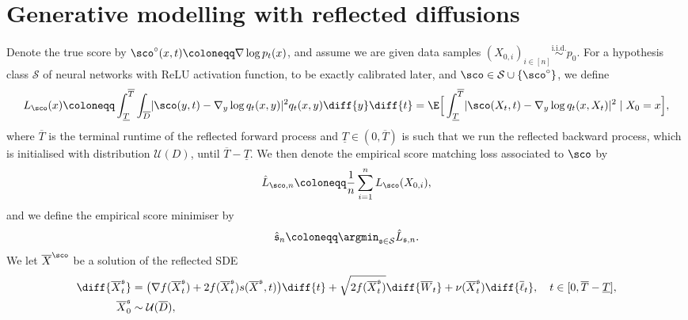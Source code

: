 \documentclass[a4paper, 11pt, headings = small, abstract]{scrartcl}
\begin{document}
\section{Generative modelling with reflected diffusions}\label{sec:main}
Denote the true score by $\sco^\circ(x,t) \coloneqq \nabla \log p_t(x)$, and assume we are given data samples $(X_{0,i})_{i \in [n]} \overset{\text{i.i.d.}}{\sim} p_0$. For a hypothesis class $\mathcal{S}$ of neural networks with ReLU activation function, to be exactly calibrated later,  and $\sco \in \mathcal{S} \cup \{\sco^\circ\}$, we define 
\begin{equation}\label{eq:lossfct}
    L_{\sco}(x) \coloneqq \int_{\underline{T}}^{\overline{T}} \int_{\overline{D}} \lvert \sco(y,t) - \nabla_y \log q_t(x,y) \rvert^2 q_t(x,y) \diff{y} \diff{t} = \E\Big[\int_{\underline{T}}^{\overline{T}} \lvert \sco(X_t,t) - \nabla_y \log q_t(x,X_t) \rvert^2 \mid X_0 = x \Big],
\end{equation}
where $\overline{T}$ is the terminal runtime of the reflected forward process and $\underline{T} \in (0, \overline{T})$ is such that we run the reflected backward process,  which is initialised with distribution $\mathcal{U}(D)$,  until $\overline{T} - \underline{T}$. We then denote the empirical score matching loss associated to $\sco$ by
\[\hat{L}_{\sco,n} \coloneqq \frac{1}{n} \sum_{i=1}^n L_{\sco}(X_{0,i}),\]
and we define the empirical score minimiser by
\begin{equation}\label{eq:score_est}
\hat{\mathfrak{s}}_n \coloneqq \argmin_{\mathfrak{s} \in \mathcal{S}} \hat{L}_{\mathfrak{s},n}.
\end{equation}
We let $\overline{X}^{\sco}$ be a solution of the reflected SDE 
\begin{equation}\label{eq:rev_score_approx}
\begin{split}
\diff{\overline{X}^{\mathfrak{s}}_t} &= \big(\nabla f(\overline{X}^{\mathfrak{s}}_t) + 2f(\overline{X}^{\mathfrak{s}}_t) s(\overline{X}^{\mathfrak{s}},t) \big)\diff{t} + \sqrt{2f(\overline{X}^{\mathfrak{s}}_t)} \diff{\overline{W}_t} + \nu(\overline{X}^{\mathfrak{s}}_t) \diff{\overline{\ell}_t}, \quad t \in [0, \overline{T} - \underline{T}],\\
\overline{X}^{\mathfrak{s}}_0 &\sim \mathcal{U}(\overline{D}),
\end{split}
\end{equation}
\end{document}

